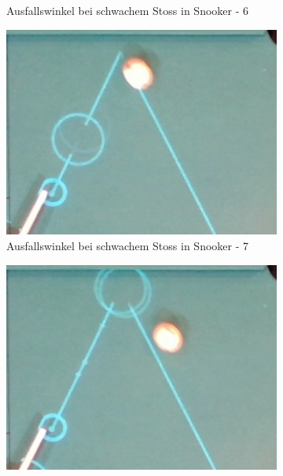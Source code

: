 \begin{figure}[h!]
\begin{subfigure}[b]{0.2\textwidth}
        \caption{Ausfallswinkel bei schwachem Stoss in Snooker - 6}
        \label{fig:rebound_angle_slow_snooker_6}
    \end{subfigure}
    \hfill
    \begin{subfigure}[b]{0.2\textwidth}
        \centering
        \includegraphics[width=1.0\linewidth]{../common/04_results/resources/simulation/rebound_angle_slow_snooker/00_rail_rebound_angle_slow_snooker_07.png}
        \caption{Ausfallswinkel bei schwachem Stoss in Snooker - 7}
        \label{fig:rebound_angle_slow_snooker_7}
    \end{subfigure}
    \hfill
    \begin{subfigure}[b]{0.2\textwidth}
        \centering
        \includegraphics[width=1.0\linewidth]{../common/04_results/resources/simulation/rebound_angle_slow_snooker/00_rail_rebound_angle_slow_snooker_08.png}

\end{subfigure}
\end{figure}
